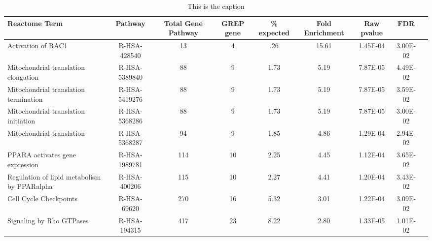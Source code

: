 
\begin{table}[ht]
\centering
\begin{adjustbox}{width=1\textwidth}
\small
\begin{tabular}{ l c c c c c c c c}
 \hline
 Reactome Term & Pathway	& Total Gene Pathway &	GREP gene & \% expected & Fold Enrichment	& Raw pvalue & FDR \\ [0.5ex]
 \hline
 Activation of RAC1 & R-HSA-428540 &	13	& 4	& .26 & 15.61	& 1.45E-04	& 3.00E-02 \\
 Mitochondrial translation elongation & R-HSA-5389840 &	88	& 9	& 1.73 &	5.19	& 7.87E-05	& 4.49E-02 \\
 Mitochondrial translation termination & R-HSA-5419276 &	88	& 9	& 1.73	& 5.19 &	7.87E-05	& 3.59E-02 \\
 Mitochondrial translation initiation & R-HSA-5368286 &	88	& 9	& 1.73 & 5.19 & 7.87E-05	& 3.00E-02 \\
 Mitochondrial translation & R-HSA-5368287 &	94	& 9	 &1.85 &	4.86	& 1.29E-04	& 2.94E-02 \\
 PPARA activates gene expression & R-HSA-1989781 & 114 &	10 &	2.25 & 4.45	& 1.12E-04	& 3.65E-02 \\
 Regulation of lipid metabolism by PPARalpha & R-HSA-400206 &	115	& 10	& 2.27 & 4.41	& 1.20E-04 & 3.43E-02 \\
 Cell Cycle Checkpoints & R-HSA-69620 &	270 & 16 & 5.32	& 3.01 &	1.22E-04 &	3.09E-02 \\
 Signaling by Rho GTPases & R-HSA-194315 & 417	& 23	& 8.22 &	2.80	& 1.33E-05 & 1.01E-02 \\
\hline
\end{tabular}
\end{adjustbox}
\caption{This is the caption }
\label{tab:rectomepathways}
\end{table}



